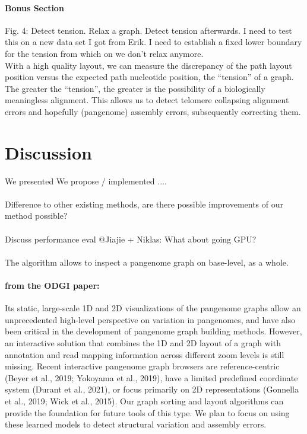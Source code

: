 \documentclass{bioinfo}
\theoremstyle{definition}
\begin{document}
    \paragraph{Bonus Section}
    Fig. 4: Detect tension. Relax a graph. Detect tension afterwards.
    I need to test this on a new data set I got from Erik.
    I need to establish a fixed lower boundary for the tension from which on we don't relax anymore. \\
    With a high quality layout, we can measure the discrepancy of the path layout position versus the expected path nucleotide position, the “tension” of a graph.
    The greater the “tension”, the greater is the possibility of a biologically meaningless alignment.
    This allows us to detect telomere collapsing alignment errors and hopefully (pangenome) assembly errors, subsequently correcting them.
    
    \fi


    \section{Discussion}
    \label{sec:discussion}
    We presented
    We propose / implemented ....

    \paragraph{}
    Difference to other existing methods, are there possible improvements of our method possible?

    \paragraph{}
    Discuss performance eval
    @Jiajie + Niklas: What about going GPU?

    \paragraph{}
    The algorithm allows to inspect a pangenome graph on base-level, as a whole.

    \paragraph{from the ODGI paper:}
    Its static, large-scale 1D and 2D visualizations of the pangenome graphs allow an unprecedented high-level perspective on variation in pangenomes, and have also been critical in the development of pangenome graph building methods.
    However, an interactive solution that combines the 1D and 2D layout of a graph with annotation and read mapping information across different zoom levels is still missing.
    Recent interactive pangenome graph browsers are reference-centric (Beyer et al., 2019; Yokoyama et al., 2019), have a limited predefined coordinate system (Durant et al., 2021), or focus primarily on 2D representations (Gonnella et al., 2019; Wick et al., 2015).
    Our graph sorting and layout algorithms can provide the foundation for future tools of this type.
    We plan to focus on using these learned models to detect structural variation and assembly errors.
\end{document}
